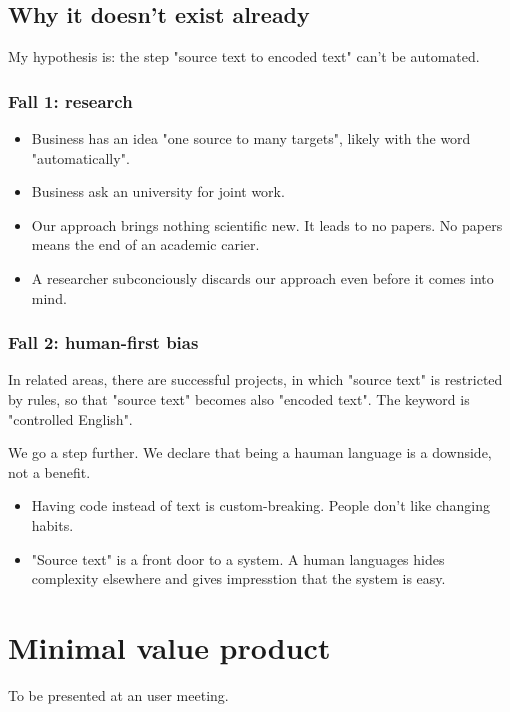 \documentclass{article}
\begin{document}
\subsection{Why it doesn't exist already}

My hypothesis is: the step "source text to encoded text" can't be automated.

\subsubsection{Fall 1: research}

\begin{itemize}
\item Business has an idea "one source to many targets", likely with the word "automatically".
\item Business ask an university for joint work.
\item Our approach brings nothing scientific new. It leads to no papers. No papers means the end of an academic carier.
\item A researcher subconciously discards our approach even before it comes into mind.
\end{itemize}

\subsubsection{Fall 2: human-first bias}

In related areas, there are successful projects, in which "source text" is restricted by rules, so that "source text" becomes also "encoded text". The keyword is "controlled English".

We go a step further. We declare that being a hauman language is a downside, not a benefit.

\begin{itemize}
\item Having code instead of text is custom-breaking. People don't like changing habits.
\item "Source text" is a front door to a system. A human languages hides complexity elsewhere and gives impresstion that the system is easy.
\end{itemize}


\section{Minimal value product}

To be presented at an user meeting.
\end{document}
